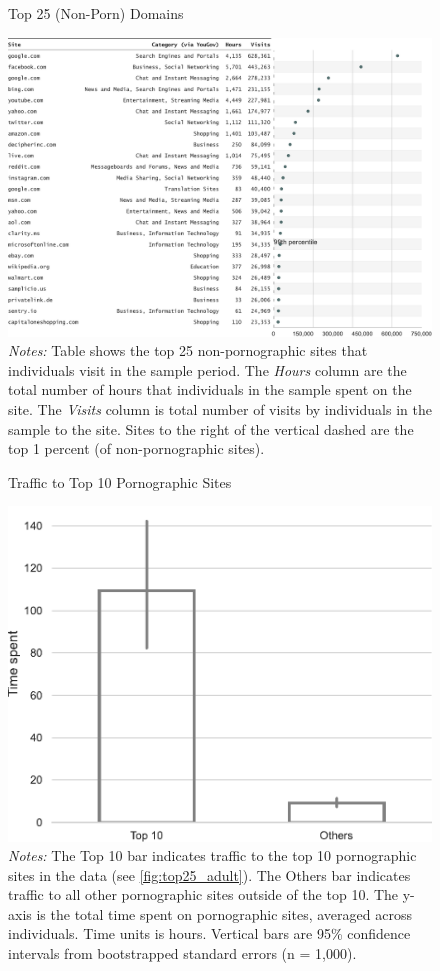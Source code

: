 \documentclass[12pt, letterpaper]{article}
\begin{document}
\begin{figure}
	\centering
	\caption{Top 25 (Non-Porn) Domains}
	\includegraphics[width=\textwidth]{../figs/top_25_nonadultsites.pdf}
	\caption*{\footnotesize \emph{Notes:} 
		Table shows the top 25 non-pornographic sites that individuals visit in the sample period.
		The \emph{Hours} column are the total number of hours that individuals in the sample spent on the site. 
		The \emph{Visits} column is total number of visits by individuals in the sample to the site.  			
		Sites to the right of the vertical dashed are the top 1 percent (of non-pornographic sites).
	}
	\label{fig:top25_nonadult}
\end{figure}


\begin{figure}
	\centering
	\caption{Traffic to Top 10 Pornographic Sites}
	\includegraphics[width=.5\textwidth]{../figs/concentration_porn_consumption.pdf}
	\caption*{\footnotesize \emph{Notes:} 
		The Top 10 bar indicates traffic to the top 10 pornographic sites in the data (see \cref{fig:top25_adult}).
		The Others bar indicates traffic to all other pornographic sites outside of the top 10.
		The y-axis is the total time spent on pornographic sites, averaged across individuals.
		Time units is hours.
		Vertical bars are 95\% confidence intervals from bootstrapped standard errors (n = 1,000).
	}
	\label{fig:concentration_porn_consumption}
\end{figure}
\end{document}
